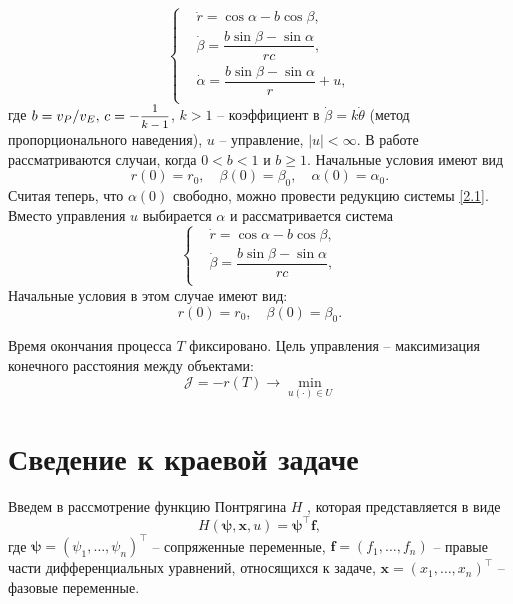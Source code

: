 \documentclass[a4paper,12pt, openany]{book}
\theoremstyle{plain} %
\theoremstyle{definition} %
\theoremstyle{remark} %
\numberwithin{equation}{chapter}
\begin{document}
{\begin{equation}\label{2.1}
\left\{ \begin{aligned}
	&\dot r = \cos \alpha  - b\cos \beta , \\ 
	&\dot \beta  = \dfrac{{b\sin \beta  - \sin \alpha }}{{rc}}, \\ 
	&\dot \alpha  = \dfrac{{b\sin \beta  - \sin \alpha }}{r} + u, \\ 
\end{aligned} \right.
\end{equation} 
где $b = v_P/v_E, \, c = -\mfrac{1}{k-1}$, $k>1$ -- коэффициент в $\dot{\beta} = k\dot{\theta}$ (метод пропорционального наведения), $u$ -- управление, $\left|u\right|<\infty$.  
\newpage
В работе рассматриваются случаи, когда $0<b<1$ и $b\geqslant 1$. 
Начальные условия имеют вид
\begin{equation}\label{2.2}
	r(0) = r_0, \quad \beta(0) = \beta_0, \quad \alpha(0) = \alpha_0.
\end{equation}
Считая теперь, что $\alpha(0)$ свободно, можно провести редукцию системы \eqref{2.1}. Вместо управления $u$ выбирается $\alpha$ и рассматривается система
\begin{equation}\label{2.3}
	\left\{ \begin{aligned}
		&\dot r = \cos \alpha  - b\cos \beta , \\ 
		&\dot \beta  = \dfrac{{b\sin \beta  - \sin \alpha }}{{rc}}, \\ 
		\end{aligned} \right.
\end{equation} 
Начальные условия в этом случае имеют вид:
\begin{equation}\label{2.4}
	r(0) = r_0, \quad \beta(0) = \beta_0.
\end{equation}

Время окончания процесса $T$ фиксировано. Цель управления -- максимизация конечного расстояния между объектами:
\begin{equation}\label{2.5}
\mathcal{J} = -r\left( T \right) \to \mathop {\min }\limits_{u\left(  \cdot  \right) \in U} 
\end{equation}

 \section{Сведение к краевой задаче}
 

Введем в рассмотрение функцию Понтрягина $H$ \cite{Optimal}, которая представляется в виде 
\begin{equation}\label{2.6}
H(\bm{\psi},\bm {x},u) = \bm{\psi}^\top \bm{f}, 
\end{equation}
где $
\bm{\psi}  = \left( {\psi _1 , \ldots ,\psi _n } \right)^\top
$ -- сопряженные переменные, $
\bm{f}  = \left( {f _1 , \ldots ,f _n } \right)
$ -- правые части дифференциальных уравнений, относящихся к задаче, $\bm{ x} = (x_1,\ldots, x_n)^\top$ -- фазовые переменные. 

}
\end{document}
